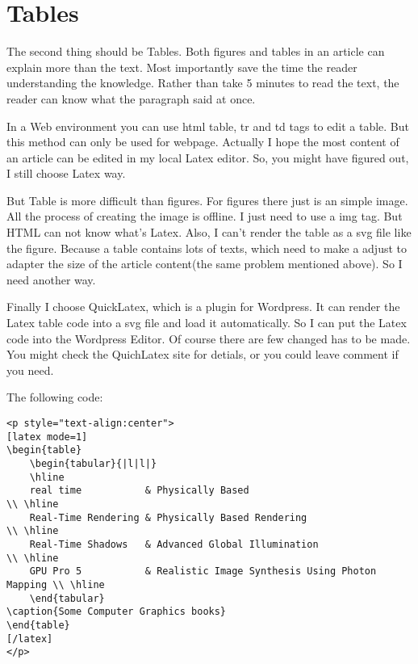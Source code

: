 \section{Tables}
The second thing should be Tables. Both figures and tables in an article can explain more than the text. Most importantly save the time the reader understanding the knowledge. Rather than take 5 minutes to read the text, the reader can know what the paragraph said at once.

In a Web environment you can use html table, tr and td tags to edit a table. But this method can only be used for webpage. Actually I hope the most content of an article can be edited in my local Latex editor. So, you might have figured out, I still choose Latex way.

But Table is more difficult than figures. For figures there just is an simple image. All the process of creating the image is offline. I just need to use a img tag. But HTML can not know what's Latex. Also, I can't render the table as a svg file like the figure. Because a table contains lots of texts, which need to make a adjust to adapter  the size of the article content(the same problem mentioned above). So I need another way.

Finally I choose QuickLatex, which is a plugin for Wordpress. It can render the Latex table code into a svg file and load it automatically. So I can put the Latex code into the Wordpress Editor. Of course there are few changed has to be made. You might check the QuichLatex site for detials, or you could leave comment if you need.     

The following code:
\begin{fullwidth}
\begin{lstlisting}[frame=single,breaklines=true]
<p style="text-align:center">
[latex mode=1]
\begin{table}
    \begin{tabular}{|l|l|}
    \hline
    real time           & Physically Based                               \\ \hline
    Real-Time Rendering & Physically Based Rendering                     \\ \hline
    Real-Time Shadows   & Advanced Global Illumination                   \\ \hline
    GPU Pro 5           & Realistic Image Synthesis Using Photon Mapping \\ \hline
    \end{tabular}
\caption{Some Computer Graphics books}
\end{table}
[/latex]
</p>
\end{lstlisting}
\end{fullwidth}

